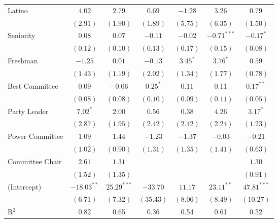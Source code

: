 \documentclass[12pt]{article}
\begin{document}
\begin{table}
\begin{center}
\begin{tabular}{l c c c c c c }
			Latino                 & $4.02$        & $2.79$        & $0.69$       & $-1.28$      & $3.26$        & $0.79$        \\
			& $(2.91)$      & $(1.90)$      & $(1.89)$     & $(5.75)$     & $(6.35)$      & $(1.50)$      \\
			Seniority              & $0.08$        & $0.07$        & $-0.11$      & $-0.02$      & $-0.71^{***}$ & $-0.17^{*}$   \\
			& $(0.12)$      & $(0.10)$      & $(0.13)$     & $(0.17)$     & $(0.15)$      & $(0.08)$      \\
			Freshman               & $-1.25$       & $0.01$        & $-0.13$      & $3.45^{*}$   & $3.76^{*}$    & $0.59$        \\
			& $(1.43)$      & $(1.19)$      & $(2.02)$     & $(1.34)$     & $(1.77)$      & $(0.78)$      \\
			Best Committee          & $0.09$        & $-0.06$       & $0.25^{*}$   & $0.11$       & $0.11$        & $0.17^{**}$   \\
			& $(0.08)$      & $(0.08)$      & $(0.10)$     & $(0.09)$     & $(0.11)$      & $(0.05)$      \\
			Party Leader                 & $7.02^{*}$    & $2.00$        & $0.56$       & $0.38$       & $4.26$        & $3.17^{*}$    \\
			& $(2.87)$      & $(1.95)$      & $(2.42)$     & $(2.42)$     & $(2.24)$      & $(1.23)$      \\
			Power Committee                  & $1.09$        & $1.44$        & $-1.23$      & $-1.37$      & $-0.03$       & $-0.21$       \\
			& $(1.02)$      & $(0.90)$      & $(1.31)$     & $(1.35)$     & $(1.41)$      & $(0.63)$      \\
			Committee Chair                  & $2.61$        & $1.31$        &              &              &               & $1.30$        \\
			& $(1.52)$      & $(1.35)$      &              &              &               & $(0.91)$      \\
			(Intercept)            & $-18.03^{**}$ & $25.29^{***}$ & $-33.70$     & $11.17$      & $23.11^{**}$  & $47.81^{***}$ \\
			& $(6.71)$      & $(7.32)$      & $(35.43)$    & $(8.06)$     & $(8.49)$      & $(10.27)$     \\
			\hline
			R$^2$                  & 0.82          & 0.65          & 0.36         & 0.54         & 0.61          & 0.52          \\

\end{tabular}
\end{center}
\end{table}
\end{document}
